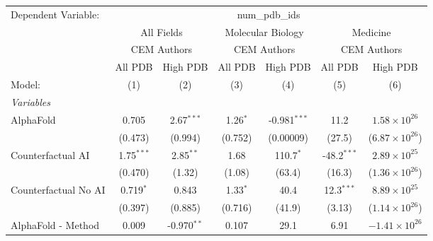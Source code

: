 \begingroup
\centering
\begin{tabular}{lcccccc}
   \tabularnewline \midrule \midrule
   Dependent Variable: & \multicolumn{6}{c}{num\_pdb\_ids}\\
 & \multicolumn{2}{c}{All Fields} & \multicolumn{2}{c}{Molecular Biology} & \multicolumn{2}{c}{Medicine} \\
\cmidrule(lr){2-3} \cmidrule(lr){4-5} \cmidrule(lr){6-7}
 & \multicolumn{2}{c}{CEM Authors} & \multicolumn{2}{c}{CEM Authors} & \multicolumn{2}{c}{CEM Authors} \\
\cmidrule(lr){2-3} \cmidrule(lr){4-5} \cmidrule(lr){6-7}
 & \multicolumn{1}{c}{All PDB} & \multicolumn{1}{c}{High PDB} & \multicolumn{1}{c}{All PDB} & \multicolumn{1}{c}{High PDB} & \multicolumn{1}{c}{All PDB} & \multicolumn{1}{c}{High PDB} \\
\cmidrule(lr){2-2} \cmidrule(lr){3-3} \cmidrule(lr){4-4} \cmidrule(lr){5-5} \cmidrule(lr){6-6} \cmidrule(lr){7-7}
   Model:                                                     & (1)           & (2)           & (3)        & (4)            & (5)           & (6)\\  
   \midrule
   \emph{Variables}\\
   AlphaFold                                                  & 0.705         & 2.67$^{***}$  & 1.26$^{*}$ & -0.981$^{***}$ & 11.2          & $1.58\times 10^{26}$\\    
                                                              & (0.473)       & (0.994)       & (0.752)    & (0.00009)      & (27.5)        & ($6.87\times 10^{26}$)\\    
   Counterfactual AI                                          & 1.75$^{***}$  & 2.85$^{**}$   & 1.68       & 110.7$^{*}$    & -48.2$^{***}$ & $2.89\times 10^{25}$\\    
                                                              & (0.470)       & (1.32)        & (1.08)     & (63.4)         & (16.3)        & ($1.36\times 10^{26}$)\\    
   Counterfactual No AI                                       & 0.719$^{*}$   & 0.843         & 1.33$^{*}$ & 40.4           & 12.3$^{***}$  & $8.89\times 10^{25}$\\    
                                                              & (0.397)       & (0.885)       & (0.716)    & (41.9)         & (3.13)        & ($1.14\times 10^{26}$)\\    
   AlphaFold - Method                                         & 0.009         & -0.970$^{**}$ & 0.107      & 29.1           & 6.91          & $-1.41\times 10^{26}$\\    

\end{tabular}
